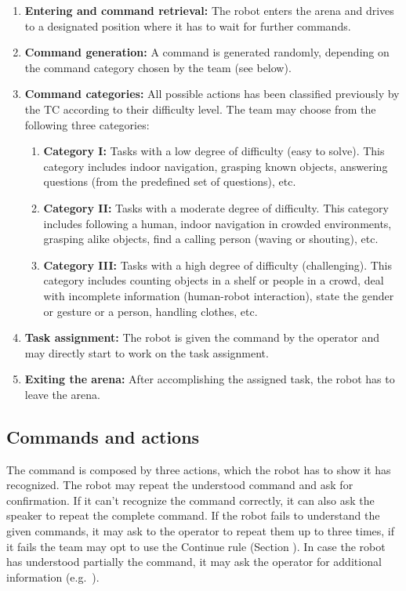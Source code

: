 \begin{enumerate}
	\item \textbf{Entering and command retrieval:} The robot enters the arena and drives to a designated position where it has to wait for further commands.
	\item \textbf{Command generation:} A command is generated randomly, depending on the command category chosen by the team (see below). \\

	\item \textbf{Command categories:} All possible actions has been classified previously by the TC according to their difficulty level. The team may choose from the following three categories:
	\begin{enumerate}
		\item \textbf{Category I:} Tasks with a low degree of difficulty (easy to solve). This category includes indoor navigation, grasping known objects, answering questions (from the predefined set of questions), etc.
		\item \textbf{Category II:} Tasks with a moderate degree of difficulty. This category includes following a human, indoor navigation in crowded environments, grasping alike objects, find a calling person (waving or shouting), etc.
		\item \textbf{Category III:} Tasks with a high degree of difficulty (challenging). This category includes counting objects in a shelf or people in a crowd, deal with incomplete information (human-robot interaction), state the gender or gesture or a person, handling clothes, etc.
	\end{enumerate}

	\item \textbf{Task assignment:} The robot is given the command by the operator and may directly start to work on the task assignment.
	\item \textbf{Exiting the arena:} After accomplishing the assigned task, the robot has to leave the arena.
\end{enumerate}

\subsection{Commands and actions}
The command is composed by three actions, which the robot has to show it has recognized. The robot may repeat the understood command and ask for confirmation. If it can't recognize the command correctly, it can also ask the speaker to repeat the complete command. If the robot fails to understand the given commands, it may ask to the operator to repeat them up to three times, if it fails the team may opt to use the Continue rule (Section ). In case the robot has understood partially the command, it may ask the operator for additional information (e.g.~).

